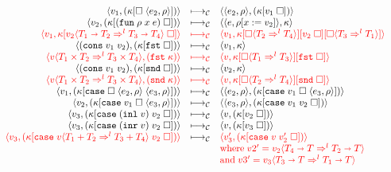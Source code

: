 \documentclass[acmsmall,review,anonymous]{acmart}\settopmatter{printfolios=true,printccs=false,printacmref=false}
\newcommand{\plus}[0]{+}
\newcommand{\sOOinspect}[3]{\langle\langle#1,#2\rangle,#3\rangle}
\newcommand{\sOOreturn}[2]{\langle#1,#2\rangle}
\newcommand{\POOfun}[2]{#1 \shortrightarrow #2}
\newcommand{\POOprod}[2]{#1 \times #2}
\newcommand{\POOsum}[2]{#1 \plus #2}
\newcommand{\cOOcast}[3]{#1 \Rightarrow^{#2} #3}
\newcommand{\vOOcast}[2]{#1\langle#2\rangle}
\newcommand{\vOOfun}[3]{\mathtt{fun} \; #1 \; #2 \; #3}
\newcommand{\vOOcons}[2]{\mathtt{cons}\;#1\;#2}
\newcommand{\vOOinl}[1]{\mathtt{inl}\;#1}
\newcommand{\vOOinr}[1]{\mathtt{inr}\;#1}
\newcommand{\kOOappI}[3]{
	#3[\square \; \langle#1,#2\rangle ]
}
\newcommand{\kOOappII}[2]{
	#2[#1 \; \square]}
\newcommand{\kOOcar}[1]{#1[\mathtt{fst} \; \square]}
\newcommand{\kOOcdr}[1]{#1[\mathtt{snd} \; \square]}
\newcommand{\kOOcaseI}[4]{
	#4[\mathtt{case} \; \square \; \langle#1,#3\rangle \; \langle#2,#3\rangle ]}
\newcommand{\kOOcaseII}[4]{
	#4[\mathtt{case} \; #1 \; \square \; \langle#2,#3\rangle ]}
\newcommand{\kOOcaseIII}[3]{
	#3[\mathtt{case} \; #1 \; #2 \; \square]}
\newcommand{\kOOcast}[2]{
	#2[\square \langle #1 \rangle]}
\newcommand{\redrule}[3]{#1 & \longmapsto_\mathcal{C} & #2 & #3\\}
\newcommand{\hiredrule}[3]{\highlight{#1} & \highlight{\longmapsto_\mathcal{C}} & \highlight{#2} & \highlight{#3} \\}
\newcommand{\highlight}[1]{{\color{red} #1}}
\begin{document}
\begin{figure}
\[\begin{array}{rclr}
\redrule{
\sOOreturn{v_1}{(\kOOappI{e_2}{\rho}{\kappa})}}{
\sOOinspect{e_2}{\rho}{(\kOOappII{v_1}{\kappa})}}{}

\redrule{
\sOOreturn{v_2}{(\kOOappII{(\vOOfun{\rho}{x}{e})}{\kappa})}}{
\sOOinspect{e}{\rho[x:=v_2]}{\kappa}}{}
	\hiredrule{
		\sOOreturn{v_1}{
			\kOOappII{\vOOcast{v_2}{
					\cOOcast{\POOfun{T_1}{T_2}}{l}{\POOfun{T_3}{T_4}}
			}}{\kappa}
		}
	}{
		\sOOreturn{v_1}{
			\kOOcast{\cOOcast{T_3}{l}{T_1}}{
				\kOOappII{v_2}{
					\kOOcast{\cOOcast{T_2}{l}{T_4}}{\kappa}
				}
			}
		}
	}{}
	\redrule{
	\sOOreturn{
		(\vOOcons{v_1}{v_2})
	}{(\kOOcar{\kappa})}
	}{
	\sOOreturn{v_1}{\kappa}
	}{}
	\hiredrule{
		\sOOreturn{
			\vOOcast{v}{\cOOcast{\POOprod{T_1}{T_2}}{l}{
					\POOprod{T_3}{T_4}}}
		}{(\mathtt{fst} \; \kappa)}
	}{
		\sOOreturn{v}{
			\kOOcar{
				\kOOcast{\cOOcast{T_1}{l}{T_3}}{\kappa}
			}}
	}{}
	\redrule{
	\sOOreturn{
		(\vOOcons{v_1}{v_2})
	}{(\kOOcdr{\kappa})}
	}{
	\sOOreturn{v_2}{\kappa}
	}{}
	
	\hiredrule{
		\sOOreturn{
			\vOOcast{v}{\cOOcast{\POOprod{T_1}{T_2}}{l}{
					\POOprod{T_3}{T_4}}}
		}{(\mathtt{snd} \; \kappa)}
	}{
		\sOOreturn{v}{
			\kOOcdr{\kOOcast{\cOOcast{T_2}{l}{T_4}}{\kappa}}}
	}{}

\redrule{
\sOOreturn{v_1}{(\kOOcaseI{e_2}{e_3}{\rho}{\kappa})}}{
\sOOinspect{e_2}{\rho}{(\kOOcaseII{v_1}{e_3}{\rho}{\kappa})}}{}

\redrule{
\sOOreturn{v_2}{(\kOOcaseII{v_1}{e_3}{\rho}{\kappa})}}{
\sOOinspect{e_3}{\rho}{
	(\kOOcaseIII{v_1}{v_2}{\kappa})
}}{}	

\redrule{
\sOOreturn{v_3}{
	(\kOOcaseIII{(\vOOinl{v})}{v_2}{\kappa})
}
}{
\sOOreturn{v}{(\kOOappII{v_2}{\kappa})}
}{}

\redrule{
	\sOOreturn{v_3}{
		(\kOOcaseIII{(\vOOinr{v})}{v_2}{\kappa})
	}
}{
\sOOreturn{v}{(\kOOappII{v_3}{\kappa})}
}{}

\redrule{
	\highlight{\sOOreturn{v_3}{
		(	\kOOcaseIII{
				\vOOcast{v}{\cOOcast{\POOsum{T_1}{T_2}}{l}{\POOsum{T_3}{T_4}}}
			}{v_2}{\kappa})
%		
	}}
}{
	\highlight{\sOOreturn{v_3'}{
			(\kOOcaseIII{v}{v_2'}{\kappa})
	}}
}{\\&&
\highlight{\text{where}\;
v2' = \vOOcast{v_2}{\cOOcast{\POOfun{T_4}{T}}{l}{\POOfun{T_2}{T}}}}
\\&&
\highlight{\text{and}\;
v3' = \vOOcast{v_3}{\cOOcast{\POOfun{T_3}{T}}{l}{\POOfun{T_1}{T}}}}
}
	

\end{array}\]
\end{figure}
\end{document}
